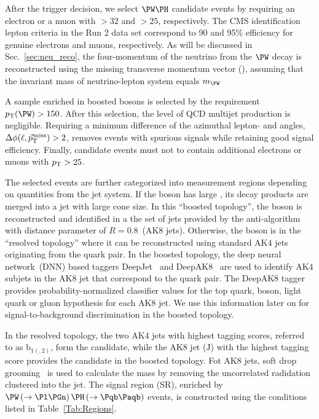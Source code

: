 \documentclass[a4paper,11pt]{article}
\newcommand{\Pb}{{{\Pqb}}\xspace}
\newcommand{\PAb}{{{{\Paqb}}}\xspace}
\begin{document}
After the trigger decision, we select $\PW\PH$ candidate events by requiring an electron or a muon with \pt$>32$ and $>25$\GeV, respectively. 
The CMS identification lepton criteria in the Run 2 data set correspond to 90 and 95\% efficiency for genuine electrons and muons, respectively. 
As will be discussed in Sec.~\ref{sec:neu_reco}, the four-momentum of the neutrino from the $\PW$ decay is reconstructed using the missing transverse momentum vector (\ptvecmiss), assuming that the invariant mass of neutrino-lepton system equals $m_{\PW}$ 

A sample enriched in boosted \PW bosons is selected by the requirement $\pt(\PW) > 150$\GeV. 
After this selection, the level of QCD multijet production is negligible.
Requiring a minimum difference of the azimuthal lepton- and \ptmiss angles, $\Delta\phi(\ell,{\vec p}_{\mathrm{T}}^{\kern1pt\text{miss}})>2$, removes events with spurious signals while retaining good signal efficiency.
Finally, \PW candidate events must not to contain additional electrons or muons with $p_{\mathrm{T}}>25$\GeV.

The selected events are further categorized into measurement regions depending on quantities from the jet system. 
If the \PH boson has large \pt, its decay products are merged into a jet with large cone size. 
In this ``boosted topology'', the \PH boson is reconstructed and identified in a the set of jets provided by the anti-\kt algorithm with distance parameter of $R=0.8$~(AK8 jets).
Otherwise, the \PH boson is in the ``resolved topology'' where it can be reconstructed using standard AK$4$ jets originating from the \Pb quark pair. 
In the boosted topology, the deep neural network~(DNN) based taggers DeepJet~\cite{Bols:2020bkb} and DeepAK8~\cite{Sirunyan:2020lcu} are used to identify AK4 subjets in the AK8 jet that correspond to the \Pb quark pair.
The DeepAK8 tagger provides probability-normalized classifier values for the top quark, \PW boson, light quark or gluon hypothesis for each AK8 jet. We use this information later on for signal-to-background discrimination in the boosted topology. %

In the resolved topology, the two AK4 jets with highest \Pb tagging scores, referred to as $\textrm{b}_{1(,2)}$, form the \PH candidate, while the AK8 jet ($\textrm{J}$) with the highest \PH tagging score provides the \PH candidate in the boosted topology.
Fot AK8 jets, soft drop grooming~\cite{Larkoski:2014wba} is used to calculate the mass by removing the uncorrelated radidation clustered into the jet. 
The signal region (SR), enriched by $\PW\left(\to \Pl \Pgn \right) \PH \left(\to \Pb \PAb \right)$ events, is constructed using the conditions listed in Table~\ref{Tab:Regions}.
\end{document}
